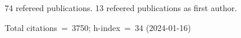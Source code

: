 74 refereed publications. 13 refeered publications as first author.

Total citations~=~3750; h-index~=~34 (2024-01-16)